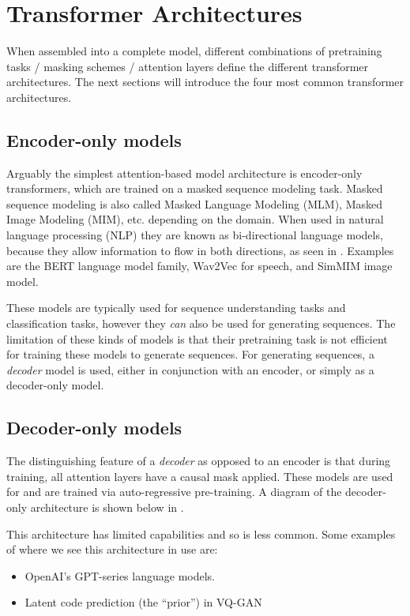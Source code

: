 \section{Transformer Architectures}

When assembled into a complete model, different combinations of pretraining tasks / masking schemes / attention layers define the different transformer architectures. The next sections will introduce the four most common transformer architectures.

\subsection{Encoder-only models}
\label{ss:encoder-only}

Arguably the simplest attention-based model architecture is encoder-only transformers, which are trained on a masked sequence modeling task. Masked sequence modeling is also called Masked Language Modeling (MLM), Masked Image Modeling (MIM), etc. depending on the domain. When used in natural language processing (NLP) they are known as bi-directional language models, because they allow information to flow in both directions, as seen in . Examples are the BERT \cite{bert} language model family, Wav2Vec \cite{wav2vec} for speech, and SimMIM \cite{sim-mim} image model.

These models are typically used for sequence understanding tasks and classification tasks, however they \textit{can} also be used for generating sequences. The limitation of these kinds of models is that their pretraining task is not efficient for training these models to generate sequences. For generating sequences, a \textit{decoder} model is used, either in conjunction with an encoder, or simply as a decoder-only model.

\subsection{Decoder-only models}
\label{ss:decoder-only}

The distinguishing feature of a \textit{decoder} as opposed to an encoder is that during training, all attention layers have a causal mask applied. These models are used for and are trained via auto-regressive pre-training. A diagram of the decoder-only architecture is shown below in .

This architecture has limited capabilities and so is less common. Some examples of where we see this architecture in use are:
\begin{itemize}
    \item OpenAI's GPT-series \cite{gpt2, gpt3} language models.
    \item Latent code prediction (the ``prior'') in VQ-GAN \cite{vqgan}
\end{itemize}

